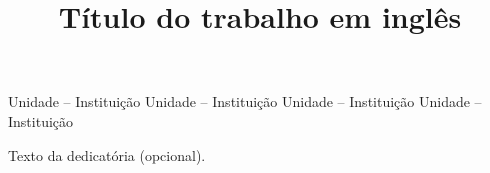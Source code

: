 \documentclass[a4paper,12pt,oneside,onecolumn,final,fleqn]{repUERJ}
\title{Título do trabalho em inglês}
\begin{document}


\frontmatter %



\capa
\folhaderosto


%

\fichacatalografica{}



\begin{folhadeaprovacao}
             {Unidade -- Instituição}
             {Unidade -- Instituição}
             {Unidade -- Instituição}
             {Unidade -- Instituição}
\end{folhadeaprovacao}



\vfill
Texto da dedicatória (opcional).



\end{document}
